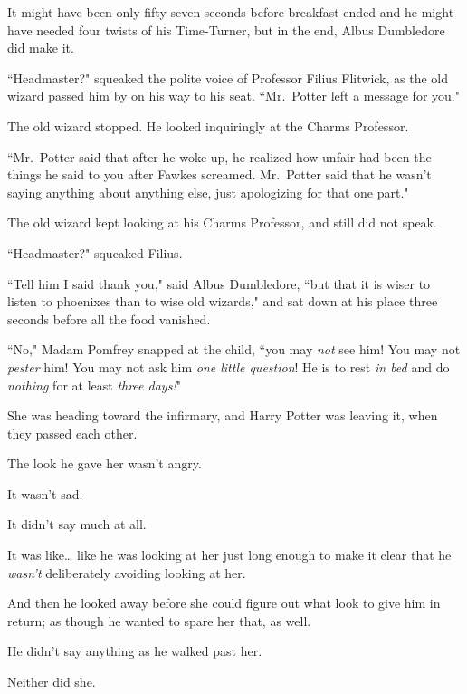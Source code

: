 
It might have been only fifty-seven seconds before breakfast ended and he might have needed four twists of his Time-Turner, but in the end, Albus Dumbledore did make it.

``Headmaster?" squeaked the polite voice of Professor Filius Flitwick, as the old wizard passed him by on his way to his seat. ``Mr.~Potter left a message for you."

The old wizard stopped. He looked inquiringly at the Charms Professor.

``Mr.~Potter said that after he woke up, he realized how unfair had been the things he said to you after Fawkes screamed. Mr.~Potter said that he wasn't saying anything about anything else, just apologizing for that one part."

The old wizard kept looking at his Charms Professor, and still did not speak.

``Headmaster?" squeaked Filius.

``Tell him I said thank you," said Albus Dumbledore, ``but that it is wiser to listen to phoenixes than to wise old wizards," and sat down at his place three seconds before all the food vanished.


``No," Madam Pomfrey snapped at the child, ``you may \emph{not} see him! You may not \emph{pester} him! You may not ask him \emph{one little question}! He is to rest \emph{in bed} and do \emph{nothing} for at least \emph{three days!}"


She was heading toward the infirmary, and Harry Potter was leaving it, when they passed each other.

The look he gave her wasn't angry.

It wasn't sad.

It didn't say much at all.

It was like{\ldots} like he was looking at her just long enough to make it clear that he \emph{wasn't} deliberately avoiding looking at her.

And then he looked away before she could figure out what look to give him in return; as though he wanted to spare her that, as well.

He didn't say anything as he walked past her.

Neither did she.

